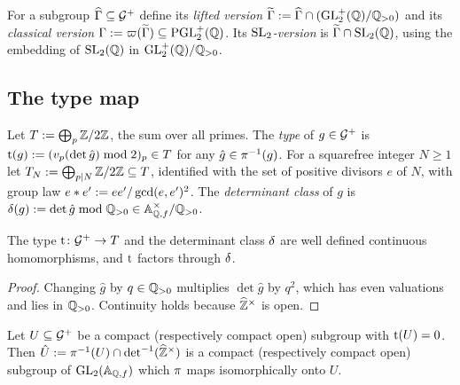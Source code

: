 \begin{definition}\label{def:versions}
For a subgroup $\widehat{\Gamma} \subseteq \mathcal{G}^{+}$ define its
\emph{lifted version}
$\widetilde{\Gamma} := \widehat{\Gamma} \cap (\mathrm{GL}_{2}^{+}(\mathbb{Q})/\mathbb{Q}_{>0})$ and its
\emph{classical version} $\Gamma := \varpi(\widetilde{\Gamma}) \subseteq
\mathrm{PGL}_{2}^{+}(\mathbb{Q})$. Its \emph{$\SL{2}{}$-version} is
$\slversion{\Gamma}$, using the embedding of $\SL{2}{\QQ}$ in
$\mathrm{GL}_{2}^{+}(\mathbb{Q})/\mathbb{Q}_{>0}$.
\end{definition}

\subsection{The type map}

\begin{definition}[Type]\label{def:type}
Let $T := \bigoplus_p \mathbb{Z}/2\mathbb{Z}$, the sum over all primes. The
\emph{type} of $g \in \mathcal{G}^{+}$ is
$\mathrm{t}(g) := (v_{p}(\det \hat g) \bmod 2)_p \in T$ for any
$\hat g \in \pi^{-1}(g)$. For a squarefree integer $N \geq 1$
let $T_{N} := \bigoplus_{p \mid N}\mathbb{Z}/2\mathbb{Z} \subseteq T$,
identified with the set of positive divisors $e$ of $N$, with group law
$e\ast e' := ee'/\gcd(e,e')^{2}$. The \emph{determinant class}
of $g$ is $\delta(g) := \det\hat g \bmod \mathbb{Q}_{>0} \in
\mathbb{A}_{\mathbb{Q},f}^{\times}/\mathbb{Q}_{>0}$.
\end{definition}

\begin{lemma}\label{lem:type-hom}
The type $\mathrm{t} \colon \mathcal{G}^{+} \to T$ and the
determinant class $\delta$ are well defined continuous homomorphisms,
and $\mathrm{t}$ factors through $\delta$.
\end{lemma}

\begin{proof}
Changing $\hat g$ by $q \in \mathbb{Q}_{>0}$ multiplies $\det\hat g$ by
$q^{2}$, which has even valuations and lies in $\mathbb{Q}_{>0}$.
Continuity holds because $\widehat{\mathbb{Z}}^{\times}$ is open.
\end{proof}

\begin{lemma}\label{lem:type-trivial-lift}
Let $U \subseteq \mathcal{G}^{+}$ be a compact (respectively compact open)
subgroup with $\mathrm{t}(U) = 0$. Then
$\hat U := \pi^{-1}(U) \cap \det^{-1}(\widehat{\mathbb{Z}}^{\times})$
is a compact (respectively compact open) subgroup of
$\GL{2}{\FiniteAdeles{\QQ}}$ which $\pi$ maps isomorphically
onto $U$.
\end{lemma}

